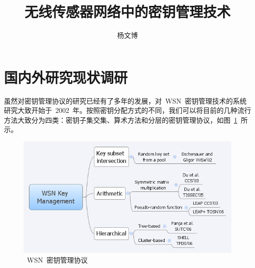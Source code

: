 \documentclass[a4paper,10pt]{article}
\title{无线传感器网络中的密钥管理技术}
\author{杨文博}
\begin{document}
\maketitle

\section{国内外研究现状调研}

虽然对密钥管理协议的研究已经有了多年的发展，对~WSN~密钥管理技术的系统研究大致开始于~2002~年。按照密钥分配方式的不同，我们可以将目前的几种流行方法大致分为四类：密钥子集交集、算术方法和分层的密钥管理协议，如图~\ref{wsn_keyman_1}~所示。

\begin{figure}[htbp]
  \centering
  \includegraphics[width=.9\textwidth,keepaspectratio]{wsn_keyman_1}
  \caption{\label{wsn_keyman_1}~WSN~密钥管理协议}
\end{figure}
\end{document}
